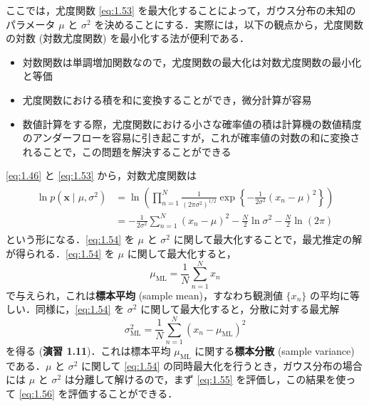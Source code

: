 \documentclass[uplatex,a4paper,oneside,openany,dvipdfmx]{jsarticle}
\numberwithin{equation}{section}
\theoremstyle{mystyle} %
\newcommand{\mb}[1]{\mathbf{#1}}
\newcommand{\tb}[1]{\textbf{#1}}
\begin{document}
ここでは，尤度関数 \eqref{eq:1.53} を最大化することによって，ガウス分布の未知のパラメータ $\mu$ と $\sigma^{2}$ を決めることにする．実際には，以下の観点から，尤度関数の対数 (対数尤度関数) を最小化する法が便利である．
\begin{itemize}
    \item 対数関数は単調増加関数なので，尤度関数の最大化は対数尤度関数の最小化と等価
    \item 尤度関数における積を和に変換することができ，微分計算が容易
    \item 数値計算をする際，尤度関数における小さな確率値の積は計算機の数値精度のアンダーフローを容易に引き起こすが，これが確率値の対数の和に変換されることで，この問題を解決することができる
\end{itemize}
\eqref{eq:1.46} と \eqref{eq:1.53} から，対数尤度関数は
\begin{align} \label{eq:1.54}
    \begin{aligned}
        \ln p(\mb{x} \mid \mu,\sigma^{2}) &= \ln \left(\prod_{n=1}^{N} \frac{1}{(2\pi\sigma^{2})^{1/2}} \exp{\left\{-\frac{1}{2\sigma^{2}}(x_{n}-\mu)^{2}\right\}}\right) \\
        &=-\frac{1}{2\sigma^{2}} \sum_{n=1}^{N} (x_{n}-\mu)^{2} - \frac{N}{2} \ln \sigma^{2} - \frac{N}{2} \ln (2\pi)
    \end{aligned}
\end{align}
という形になる．\eqref{eq:1.54} を $\mu$ と $\sigma^{2}$ に関して最大化することで，最尤推定の解が得られる．\eqref{eq:1.54} を $\mu$ に関して最大化すると，
\begin{equation} \label{eq:1.55}
    \mu_{\text{ML}} = \frac{1}{N} \sum_{n=1}^{N} x_{n}
\end{equation}
で与えられ，これは\tb{標本平均} (sample mean)，すなわち観測値 $\{x_{n}\}$ の平均に等しい．同様に，\eqref{eq:1.54} を $\sigma^{2}$ に関して最大化すると，分散に対する最尤解
\begin{equation} \label{eq:1.56}
    \sigma_{\text{ML}}^{2} = \frac{1}{N} \sum_{n=1}^{N} (x_{n}-\mu_{\text{ML}})^{2}
\end{equation}
を得る (\tb{演習 1.11})．これは標本平均 $\mu_{\text{ML}}$ に関する\tb{標本分散} (sample variance) である．$\mu$ と $\sigma^{2}$ に関して \eqref{eq:1.54} の同時最大化を行うとき，ガウス分布の場合には $\mu$ と $\sigma^{2}$ は分離して解けるので，まず \eqref{eq:1.55} を評価し，この結果を使って \eqref{eq:1.56} を評価することができる．
\end{document}
